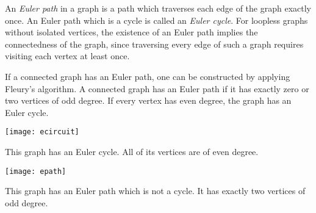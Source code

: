 \documentclass[12pt]{article}
\begin{document}
An \emph{Euler path} in a graph is a path which traverses each edge of the graph exactly once.  An Euler path which is a cycle is called an \emph{Euler cycle}.  For loopless graphs without isolated vertices, the existence of an Euler path implies the connectedness of the graph, since traversing every edge of such a graph requires visiting each vertex at least once.

If a connected graph has an Euler path, one can be constructed by applying Fleury's algorithm.  A connected graph has an Euler path if it has exactly zero or two vertices of odd degree.  If every vertex has even degree, the graph has an Euler cycle.

\begin{center}
\texttt{[image: ecircuit]}
\end{center}

This graph has an Euler cycle.  All of its vertices are of even degree.

\begin{center}
\texttt{[image: epath]}
\end{center}

This graph has an Euler path which is not a cycle. It has exactly two vertices of odd degree.

\end{document}
